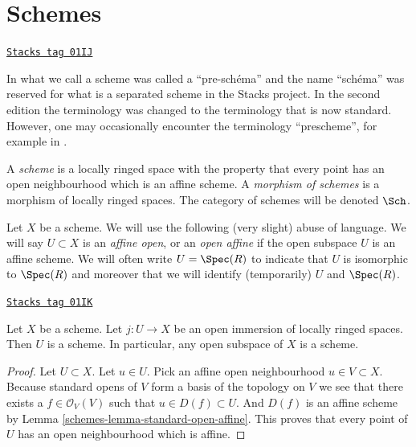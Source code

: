 \section{Schemes}
\label{schemes-section-schemes}
\begin{definition}[Scheme]
\label{schemes-definition-scheme}
\href{https://stacks.math.columbia.edu/tag/01IJ}{\texttt{Stacks tag 01IJ}}

\begin{history}
In \cite{EGA1} what we call a scheme was called a ``pre-sch\'ema'' and the
name ``sch\'ema'' was reserved for what is a separated scheme in the
Stacks project. In the second edition \cite{EGA1-second} the terminology
was changed to the terminology that is now standard. However, one may
occasionally encounter the terminology ``prescheme'', for example in
\cite{Murre-lectures}.
\end{history}
A {\it scheme} is a locally ringed space with the property that
every point has an open neighbourhood which is an affine scheme.
A {\it morphism of schemes} is a morphism of locally
ringed spaces. The category of schemes will be denoted
$\Sch$.
\end{definition}

Let $X$ be a scheme.
We will use the following (very slight) abuse of language.
We will say $U \subset X$ is an {\it affine open}, or an {\it open affine}
if the open subspace $U$ is an affine scheme. We will often
write $U = \Spec(R)$ to indicate that $U$ is isomorphic
to $\Spec(R)$ and moreover that we will identify (temporarily)
$U$ and $\Spec(R)$.

\begin{lemma}
\label{schemes-lemma-open-subspace-scheme}
\href{https://stacks.math.columbia.edu/tag/01IK}{\texttt{Stacks tag 01IK}}

Let $X$ be a scheme. Let $j : U \to X$ be an open immersion
of locally ringed spaces. Then $U$ is a scheme. In particular,
any open subspace of $X$ is a scheme.
\end{lemma}

\begin{proof}

Let $U \subset X$. Let $u \in U$.
Pick an affine open neighbourhood $u \in V \subset X$.
Because standard opens of $V$ form a basis of the topology
on $V$ we see that there exists a $f\in \mathcal{O}_V(V)$
such that $u \in D(f) \subset U$. And $D(f)$ is an affine scheme
by Lemma \ref{schemes-lemma-standard-open-affine}. This proves that every point
of $U$ has an open neighbourhood which is affine.
\end{proof}

